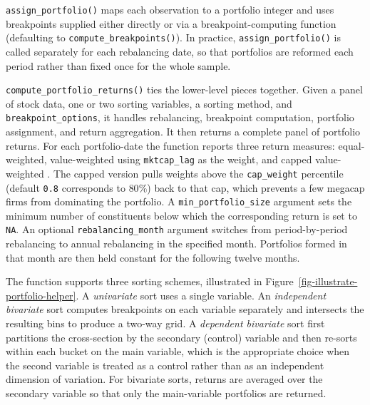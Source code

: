 \documentclass[
  article]{jss}
\begin{document}
\texttt{assign\_portfolio()} maps each observation to a portfolio
integer and uses breakpoints supplied either directly or via a
breakpoint-computing function (defaulting to
\texttt{compute\_breakpoints()}). In practice,
\texttt{assign\_portfolio()} is called separately for each rebalancing
date, so that portfolios are reformed each period rather than fixed once
for the whole sample.

\texttt{compute\_portfolio\_returns()} ties the lower-level pieces
together. Given a panel of stock data, one or two sorting variables, a
sorting method, and \texttt{breakpoint\_options}, it handles
rebalancing, breakpoint computation, portfolio assignment, and return
aggregation. It then returns a complete panel of portfolio returns. For
each portfolio-date the function reports three return measures:
equal-weighted, value-weighted using \texttt{mktcap\_lag} as the weight,
and capped value-weighted \citep{jensen.2023}. The capped version pulls
weights above the \texttt{cap\_weight} percentile (default \texttt{0.8}
corresponds to \(80\%\)) back to that cap, which prevents a few megacap
firms from dominating the portfolio. A \texttt{min\_portfolio\_size}
argument sets the minimum number of constituents below which the
corresponding return is set to \texttt{NA}. An optional
\texttt{rebalancing\_month} argument switches from period-by-period
rebalancing to annual rebalancing in the specified month. Portfolios
formed in that month are then held constant for the following twelve
months.

The function supports three sorting schemes, illustrated in
Figure~\ref{fig-illustrate-portfolio-helper}. A \emph{univariate} sort
uses a single variable. An \emph{independent bivariate} sort computes
breakpoints on each variable separately and intersects the resulting
bins to produce a two-way grid. A \emph{dependent bivariate} sort first
partitions the cross-section by the secondary (control) variable and
then re-sorts within each bucket on the main variable, which is the
appropriate choice when the second variable is treated as a control
rather than as an independent dimension of variation. For bivariate
sorts, returns are averaged over the secondary variable so that only the
main-variable portfolios are returned.
\end{document}
